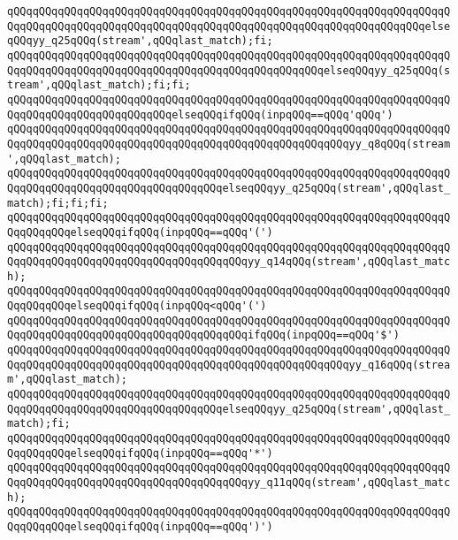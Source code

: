 \verb|qQQqqQQqqQQqqQQqqQQqqQQqqQQqqQQqqQQqqQQqqQQqqQQqqQQqqQQqqQQqqQQqqQQqqQQqqQQqqQQqqQQqqQQqqQQqqQQqqQQqqQQqqQQqqQQqqQQqqQQqqQQqqQQqqQQqqQQqelseqQQqyy_q25qQQq(stream',qQQqlast_match);fi;|\newline
\verb|qQQqqQQqqQQqqQQqqQQqqQQqqQQqqQQqqQQqqQQqqQQqqQQqqQQqqQQqqQQqqQQqqQQqqQQqqQQqqQQqqQQqqQQqqQQqqQQqqQQqqQQqqQQqqQQqqQQqqQQqelseqQQqyy_q25qQQq(stream',qQQqlast_match);fi;fi;|\newline
\verb|qQQqqQQqqQQqqQQqqQQqqQQqqQQqqQQqqQQqqQQqqQQqqQQqqQQqqQQqqQQqqQQqqQQqqQQqqQQqqQQqqQQqqQQqqQQqqQQqelseqQQqifqQQq(inpqQQq==qQQq'qQQq')|\newline
\verb|qQQqqQQqqQQqqQQqqQQqqQQqqQQqqQQqqQQqqQQqqQQqqQQqqQQqqQQqqQQqqQQqqQQqqQQqqQQqqQQqqQQqqQQqqQQqqQQqqQQqqQQqqQQqqQQqqQQqqQQqqQQqyy_q8qQQq(stream',qQQqlast_match);|\newline
\verb|qQQqqQQqqQQqqQQqqQQqqQQqqQQqqQQqqQQqqQQqqQQqqQQqqQQqqQQqqQQqqQQqqQQqqQQqqQQqqQQqqQQqqQQqqQQqqQQqqQQqqQQqelseqQQqyy_q25qQQq(stream',qQQqlast_match);fi;fi;fi;|\newline
\verb|qQQqqQQqqQQqqQQqqQQqqQQqqQQqqQQqqQQqqQQqqQQqqQQqqQQqqQQqqQQqqQQqqQQqqQQqqQQqqQQqelseqQQqifqQQq(inpqQQq==qQQq'(')|\newline
\verb|qQQqqQQqqQQqqQQqqQQqqQQqqQQqqQQqqQQqqQQqqQQqqQQqqQQqqQQqqQQqqQQqqQQqqQQqqQQqqQQqqQQqqQQqqQQqqQQqqQQqqQQqqQQqyy_q14qQQq(stream',qQQqlast_match);|\newline
\verb|qQQqqQQqqQQqqQQqqQQqqQQqqQQqqQQqqQQqqQQqqQQqqQQqqQQqqQQqqQQqqQQqqQQqqQQqqQQqqQQqelseqQQqifqQQq(inpqQQq<qQQq'(')|\newline
\verb|qQQqqQQqqQQqqQQqqQQqqQQqqQQqqQQqqQQqqQQqqQQqqQQqqQQqqQQqqQQqqQQqqQQqqQQqqQQqqQQqqQQqqQQqqQQqqQQqqQQqqQQqqQQqifqQQq(inpqQQq==qQQq'$')|\newline
\verb|qQQqqQQqqQQqqQQqqQQqqQQqqQQqqQQqqQQqqQQqqQQqqQQqqQQqqQQqqQQqqQQqqQQqqQQqqQQqqQQqqQQqqQQqqQQqqQQqqQQqqQQqqQQqqQQqqQQqqQQqqQQqyy_q16qQQq(stream',qQQqlast_match);|\newline
\verb|qQQqqQQqqQQqqQQqqQQqqQQqqQQqqQQqqQQqqQQqqQQqqQQqqQQqqQQqqQQqqQQqqQQqqQQqqQQqqQQqqQQqqQQqqQQqqQQqqQQqqQQqelseqQQqyy_q25qQQq(stream',qQQqlast_match);fi;|\newline
\verb|qQQqqQQqqQQqqQQqqQQqqQQqqQQqqQQqqQQqqQQqqQQqqQQqqQQqqQQqqQQqqQQqqQQqqQQqqQQqqQQqelseqQQqifqQQq(inpqQQq==qQQq'*')|\newline
\verb|qQQqqQQqqQQqqQQqqQQqqQQqqQQqqQQqqQQqqQQqqQQqqQQqqQQqqQQqqQQqqQQqqQQqqQQqqQQqqQQqqQQqqQQqqQQqqQQqqQQqqQQqqQQqyy_q11qQQq(stream',qQQqlast_match);|\newline
\verb|qQQqqQQqqQQqqQQqqQQqqQQqqQQqqQQqqQQqqQQqqQQqqQQqqQQqqQQqqQQqqQQqqQQqqQQqqQQqqQQqelseqQQqifqQQq(inpqQQq==qQQq')')|\newline
